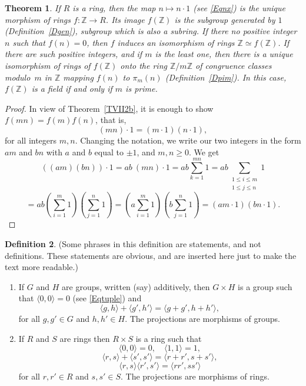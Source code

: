 \documentclass[12pt,letterpaper]{article}
\newcommand{\Z}{\mathbb{Z}}
\newcommand{\Zm}[1]{\Z/#1\Z}
\newtheorem{thm}{Theorem}%
\theoremstyle{definition}
\newtheorem{defn}[thm]{Definition}
\begin{document}
\begin{thm}\label{Tmorph}
If $R$ is a ring, then the map $n\mapsto n\cdot 1$ (see \eqref{Eqnx}) is the unique morphism of rings $f:\Z\to R$. Its image $f(\Z)$ is the subgroup generated by $1$ (Definition~\ref{Dgen}), subgroup which is also a subring. If there no positive integer $n$ such that $f(n)=0$, then $f$ induces an isomorphism of rings $\Z\simeq f(\Z)$. If there are such positive integers, and if $m$ is the least one, then there is a unique isomorphism of rings of $f(\Z)$ onto the ring $\Zm{m}$ of congruence classes modulo~$m$ in $\Z$ mapping $f(n)$ to $\pi_m(n)$ (Definition~\ref{Dpim}). In this case, $f(\Z)$ is a field if and only if $m$ is prime. 
\end{thm}

\begin{proof}
In view of Theorem~\ref{TVII2b}, it is enough to show $f(mn)=f(m)f(n)$, that is, 
$$
(mn)\cdot 1=(m\cdot 1)(n\cdot 1),
$$ 
for all integers $m, n$. Changing the notation, we write our two integers in the form $a m$ and $b n$ with $a$ and $b$ equal to $\pm1$, and $m, n\ge0$. We get 
$$
((am)(bn))\cdot 1 = ab\ (mn) \cdot 1 = ab \sum_{k=1}^{mn} 1 = ab \sum_{\substack{1\le i\le m \\ 1\le j\le n}} 1
$$ 
$$ 
= ab \left(\sum_{i=1}^{m}1\right)\left(\sum_{j=1}^{n}1\right) = \left(a\sum_{i=1}^{m}1\right) \left(b\sum_{j=1}^{n}1\right) = (am\cdot 1)(bn\cdot 1).
$$ 
\end{proof}


\begin{defn}\label{Dprod2} 
(Some phrases in this definition are statements, and not definitions. These statements are obvious, and are inserted here just to make the text more readable.) 
\begin{enumerate}
\item If $G$ and $H$ are groups, written (say) additively, then $G\times H$  is a group such that $\langle0,0\rangle=0$ (see \eqref{Eqtuple}) and 
$$
\langle g,h\rangle+\langle g',h'\rangle=\langle g+g',h+h'\rangle,
$$ 
for all $g,g'\in G$ and $h,h'\in H$. The projections are morphisms of groups. 

\item If $R$ and $S$ are rings then $R\times S$ is a ring such that 
$$
\langle0,0\rangle=0,\quad \langle1, 1\rangle=1,
$$ 
$$
\langle r,s\rangle+\langle s',s'\rangle=\langle r+r',s+s'\rangle,
$$ 
$$
\langle r,s\rangle\langle r',s'\rangle=\langle rr',ss'\rangle
$$ 
for all $r,r'\in R$ and $s,s'\in S$. The projections are morphisms of rings. 
\end{enumerate}
\end{defn}
\end{document}
